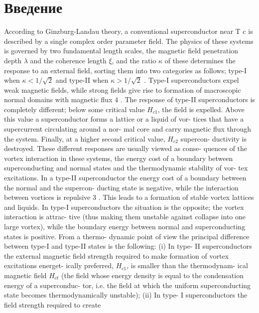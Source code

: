 \chapter{Введение}
\label{ch:1}

According to Ginzburg-Landau theory, a conventional
superconductor near T c is described by a single complex
order parameter field. The physics of these systems is
governed by two fundamental length scales, the magnetic
field penetration depth \( \lambda \) and the coherence length \( \xi \), and
the ratio \( \kappa \) of these determines the response to an external
field, sorting them into two categories as follows; type-I
when \( \kappa < 1/\sqrt{2} \) and type-II when \( \kappa > 1/\sqrt{2} \)
\footnotemark[3] .
Type-I superconductors expel weak magnetic fields,
while strong fields give rise to formation of macroscopic
normal domains with magnetic flux 4 . The response of
type-II superconductors is completely different; below
some critical value \( H_{c1} \), the field is expelled. Above this
value a superconductor forms a lattice or a liquid of vor-
tices that have a supercurrent circulating around a nor-
mal core and carry magnetic flux through the system.
Finally, at a higher second critical value, \( H_{c2} \) supercon-
ductivity is destroyed.
These different responses are usually viewed as conse-
quences of the vortex interaction in these systems, the
energy cost of a boundary between superconducting and
normal states and the thermodynamic stability of vor-
tex excitations. In a type-II superconductor the energy
cost of a boundary between the normal and the supercon-
ducting state is negative, while the interaction between
vortices is repulsive 3 . This leads to a formation of stable
vortex lattices and liquids. In type-I superconductors the
situation is the opposite; the vortex interaction is attrac-
tive (thus making them unstable against collapse into one
large vortex), while the boundary energy between normal
and superconducting states is positive. From a thermo-
dynamic point of view the principal difference between
type-I and type-II states is the following: (i) In type-
II superconductors the external magnetic field strength
required to make formation of vortex excitations energet-
ically preferred, \( H_{c1} \), is smaller than the thermodynam-
ical magnetic field \( H_{ct} \) (the field whose energy density
is equal to the condensation energy of a superconduc-
tor, i.e. the field at which the uniform superconducting
state becomes thermodynamically unstable); (ii) In type-
I superconductors the field strength required to create
